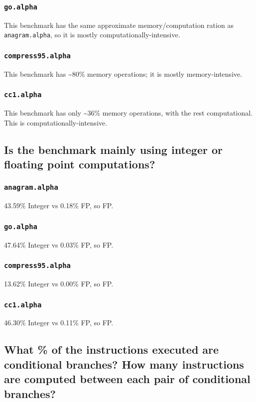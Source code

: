 \documentclass[11pt]{article}
\begin{document}
\subsubsection{\texttt{go.alpha}}
\label{sec:org2e99dc9}
This benchmark has the same approximate memory/computation ration as \texttt{anagram.alpha}, so it is mostly computationally-intensive.
\subsubsection{\texttt{compress95.alpha}}
\label{sec:orga2d0592}
This benchmark has \textasciitilde{}80\% memory operations; it is mostly memory-intensive.
\subsubsection{\texttt{cc1.alpha}}
\label{sec:orgeea9b66}
This benchmark has only \textasciitilde{}36\% memory operations, with the rest computational. This is computationally-intensive.

\subsection{Is the benchmark mainly using integer or floating point computations?}
\label{sec:orgc063fbe}
\subsubsection{\texttt{anagram.alpha}}
\label{sec:org4888d35}
43.59\% Integer vs 0.18\% FP, so FP.
\subsubsection{\texttt{go.alpha}}
\label{sec:org42d612c}
47.64\% Integer vs 0.03\% FP, so FP.
\subsubsection{\texttt{compress95.alpha}}
\label{sec:orgc460a80}
13.62\% Integer vs 0.00\% FP, so FP.
\subsubsection{\texttt{cc1.alpha}}
\label{sec:org53b3f64}
46.30\% Integer vs 0.11\% FP, so FP.

\subsection{What \% of the instructions executed are conditional branches? How many instructions are computed between each pair of conditional branches?}
\label{sec:orgcbec6f3}
\end{document}
